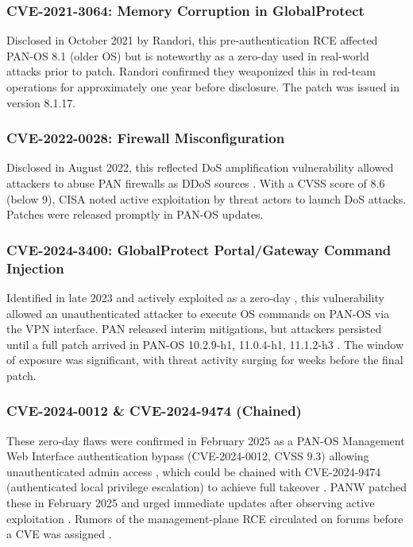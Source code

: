 \documentclass[12pt]{article}
\begin{document}
\subsubsection{CVE-2021-3064: Memory Corruption in GlobalProtect}
Disclosed in October 2021 by Randori, this pre-authentication RCE affected PAN-OS 8.1 (older OS) but is noteworthy as a zero-day used in real-world attacks prior to patch. Randori confirmed they weaponized this in red-team operations for approximately one year before disclosure. The patch was issued in version 8.1.17.

\subsubsection{CVE-2022-0028: Firewall Misconfiguration}
Disclosed in August 2022, this reflected DoS amplification vulnerability allowed attackers to abuse PAN firewalls as DDoS sources \cite{cisapalo2024}. With a CVSS score of 8.6 (below 9), CISA noted active exploitation by threat actors to launch DoS attacks. Patches were released promptly in PAN-OS updates.

\subsubsection{CVE-2024-3400: GlobalProtect Portal/Gateway Command Injection}
Identified in late 2023 and actively exploited as a zero-day \cite{twic2024}, this vulnerability allowed an unauthenticated attacker to execute OS commands on PAN-OS via the VPN interface. PAN released interim mitigations, but attackers persisted until a full patch arrived in PAN-OS 10.2.9-h1, 11.0.4-h1, 11.1.2-h3 \cite{cve20243400}. The window of exposure was significant, with threat activity surging for weeks before the final patch.

\subsubsection{CVE-2024-0012 \& CVE-2024-9474 (Chained)}
These zero-day flaws were confirmed in February 2025 as a PAN-OS Management Web Interface authentication bypass (CVE-2024-0012, CVSS 9.3) allowing unauthenticated admin access \cite{cybersecuritydive2024}, which could be chained with CVE-2024-9474 (authenticated local privilege escalation) to achieve full takeover \cite{theregister2024}. PANW patched these in February 2025 and urged immediate updates after observing active exploitation \cite{cve20240012}. Rumors of the management-plane RCE circulated on forums before a CVE was assigned \cite{paloalto2024}.
\end{document}
